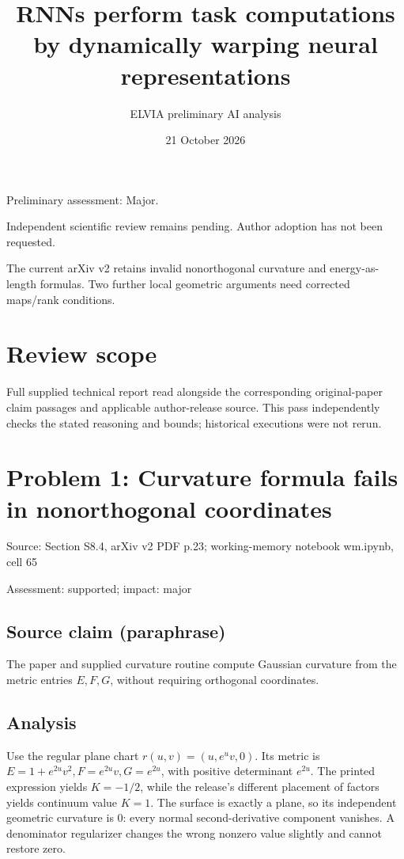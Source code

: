 \documentclass[11pt]{article}
\begin{document}
\title{RNNs perform task computations by dynamically warping neural representations}

\author{ELVIA preliminary AI analysis}\date{21 October 2026}\maketitle

Preliminary assessment: Major.\par

Independent scientific review remains pending. Author adoption has not been requested.

The current arXiv v2 retains invalid nonorthogonal curvature and energy-as-length formulas. Two further local geometric arguments need corrected maps/rank conditions.

\section*{Review scope}

Full supplied technical report read alongside the corresponding original-paper claim passages and applicable author-release source. This pass independently checks the stated reasoning and bounds; historical executions were not rerun.

\section*{Problem 1: Curvature formula fails in nonorthogonal coordinates}

Source: Section S8.4, arXiv v2 PDF p.23; working-memory notebook wm.ipynb, cell 65

Assessment: supported; impact: major

\subsection*{Source claim (paraphrase)}

The paper and supplied curvature routine compute Gaussian curvature from the metric entries \(E,F,G\), without requiring orthogonal coordinates.

\subsection*{Analysis}

Use the regular plane chart \(r(u,v)=(u,e^uv,0)\). Its metric is \(E=1+e^{2u}v^2,F=e^{2u}v,G=e^{2u}\), with positive determinant \(e^{2u}\). The printed expression yields \(K=-1/2\), while the release’s different placement of factors yields continuum value \(K=1\). The surface is exactly a plane, so its independent geometric curvature is \(0\): every normal second-derivative component vanishes. A denominator regularizer changes the wrong nonzero value slightly and cannot restore zero.
\end{document}
